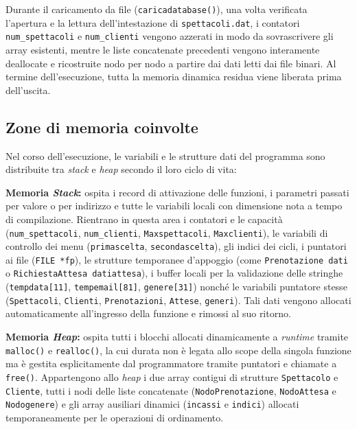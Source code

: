 \documentclass[11pt,a4paper,oneside,openany]{book}
\newenvironment{listacomp}{%
    \small
    \begin{list}{\textendash}{%
        \setlength{\topsep}{2pt}%
        \setlength{\partopsep}{0pt}%
        \setlength{\itemsep}{1pt}%
        \setlength{\parsep}{0pt}%
        \setlength{\leftmargin}{1.2em}%
    }%
}{%
    \end{list}%
}
\begin{document}
Durante il caricamento da file (\texttt{caricadatabase()}), una volta verificata l'apertura e la lettura dell'intestazione di \texttt{spettacoli.dat}, i contatori \texttt{num\_spettacoli} e \texttt{num\_clienti} vengono azzerati in modo da sovrascrivere gli array esistenti, mentre le liste concatenate precedenti vengono interamente deallocate e ricostruite nodo per nodo a partire dai dati letti dai file binari. Al termine dell'esecuzione, tutta la memoria dinamica residua viene liberata prima dell'uscita.

\subsection{Zone di memoria coinvolte}
Nel corso dell'esecuzione, le variabili e le strutture dati del programma sono distribuite tra \emph{stack} e \emph{heap} secondo il loro ciclo di vita:
\begin{listacomp}
    \item \textbf{Memoria \emph{Stack}:} ospita i record di attivazione delle funzioni, i parametri passati per valore o per indirizzo e tutte le variabili locali con dimensione nota a tempo di compilazione. Rientrano in questa area i contatori e le capacità (\texttt{num\_spettacoli}, \texttt{num\_clienti}, \texttt{Maxspettacoli}, \texttt{Maxclienti}), le variabili di controllo dei menu (\texttt{primascelta}, \texttt{secondascelta}), gli indici dei cicli, i puntatori ai file (\texttt{FILE *fp}), le strutture temporanee d'appoggio (come \texttt{Prenotazione dati} o \texttt{RichiestaAttesa datiattesa}), i buffer locali per la validazione delle stringhe (\texttt{tempdata[11]}, \texttt{tempemail[81]}, \texttt{genere[31]}) nonché le variabili puntatore stesse (\texttt{Spettacoli}, \texttt{Clienti}, \texttt{Prenotazioni}, \texttt{Attese}, \texttt{generi}). Tali dati vengono allocati automaticamente all'ingresso della funzione e rimossi al suo ritorno.
    \item \textbf{Memoria \emph{Heap}:} ospita tutti i blocchi allocati dinamicamente a \emph{runtime} tramite \texttt{malloc()} e \texttt{realloc()}, la cui durata non è legata allo scope della singola funzione ma è gestita esplicitamente dal programmatore tramite puntatori e chiamate a \texttt{free()}. Appartengono allo \emph{heap} i due array contigui di strutture \texttt{Spettacolo} e \texttt{Cliente}, tutti i nodi delle liste concatenate (\texttt{NodoPrenotazione}, \texttt{NodoAttesa} e \texttt{Nodogenere}) e gli array ausiliari dinamici (\texttt{incassi} e \texttt{indici}) allocati temporaneamente per le operazioni di ordinamento.
\end{listacomp}
\end{document}

